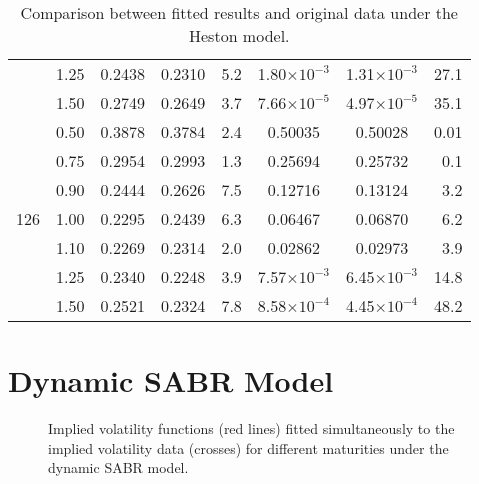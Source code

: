 \begin{table}[H]
\begin{tabular}{@{}lccccccr@{}}
 & 1.25 & 0.2438 & 0.2310 & 5.2 & 1.80$\times10^{-3}$ & 1.31$\times10^{-3}$ & 27.1 \\
 & 1.50 & 0.2749 & 0.2649 & 3.7 & 7.66$\times10^{-5}$ & 4.97$\times10^{-5}$ & 35.1 \\\midrule
\multirow{7}{*}{126} & 0.50 & 0.3878 & 0.3784 & 2.4 & 0.50035 & 0.50028 & 0.01 \\
 & 0.75 & 0.2954 & 0.2993 & 1.3 & 0.25694 & 0.25732 & 0.1 \\
 & 0.90 & 0.2444 & 0.2626 & 7.5 & 0.12716 & 0.13124 & 3.2 \\
 & 1.00 & 0.2295 & 0.2439 & 6.3 & 0.06467 & 0.06870 & 6.2 \\
 & 1.10 & 0.2269 & 0.2314 & 2.0 & 0.02862 & 0.02973 & 3.9 \\
 & 1.25 & 0.2340 & 0.2248 & 3.9 & 7.57$\times10^{-3}$ & 6.45$\times10^{-3}$ & 14.8 \\
 & 1.50 & 0.2521 & 0.2324 & 7.8 & 8.58$\times10^{-4}$ & 4.45$\times10^{-4}$ & 48.2 \\ 
 \bottomrule
\end{tabular}
  \caption[Comparison between fitted results and original data under the Heston model.]{Comparison between fitted results and original data under the Heston model.}
  \label{tab:H}
\end{table}











\newpage

\section{Dynamic SABR Model}
\begin{figure}[H]
  \begin{subfigmatrix}{2}
  \end{subfigmatrix}
  \caption[Implied volatility functions fitted simultaneously to the implied volatility data for different maturities under the dynamic SABR model.]{Implied volatility functions (red lines) fitted simultaneously to the implied volatility data (crosses) for different maturities under the dynamic SABR model.}
  \label{fig:DS}
\end{figure}


